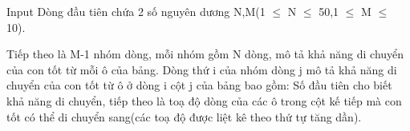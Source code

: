 Input  
Dòng đầu tiên chứa 2 số nguyên dương N,M(1 $\le$ N $\le$ 50,1 $\le$ M $\le$ 10).  

   Tiếp theo là M-1 nhóm dòng, mỗi nhóm gồm N dòng, mô tả khả năng di chuyển của con tốt từ mỗi ô của bảng. Dòng thứ i của nhóm dòng j mô tả khả năng di chuyển của con tốt từ ô ở dòng i cột j của bảng bao gồm: Số đầu tiên cho biết khả năng di chuyển, tiếp theo là toạ độ dòng của các ô trong cột kế tiếp mà con tốt có thể di chuyển sang(các toạ độ được liệt kê theo thứ tự tăng dần).